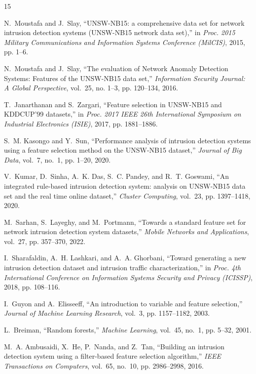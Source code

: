 \documentclass[conference]{IEEEtran}
\begin{document}
\begin{thebibliography}{15}

N.~Moustafa and J.~Slay, ``{UNSW-NB15}: a comprehensive data set for network intrusion detection systems ({UNSW-NB15} network data set),'' in \emph{Proc. 2015 Military Communications and Information Systems Conference (MilCIS)}, 2015, pp. 1--6.

N.~Moustafa and J.~Slay, ``The evaluation of Network Anomaly Detection Systems: Features of the {UNSW-NB15} data set,'' \emph{Information Security Journal: A Global Perspective}, vol.~25, no. 1--3, pp. 120--134, 2016.

T.~Janarthanan and S.~Zargari, ``Feature selection in {UNSW-NB15} and {KDDCUP'99} datasets,'' in \emph{Proc. 2017 IEEE 26th International Symposium on Industrial Electronics (ISIE)}, 2017, pp. 1881--1886.

S.~M. Kasongo and Y.~Sun, ``Performance analysis of intrusion detection systems using a feature selection method on the {UNSW-NB15} dataset,'' \emph{Journal of Big Data}, vol.~7, no.~1, pp. 1--20, 2020.

V.~Kumar, D.~Sinha, A.~K. Das, S.~C. Pandey, and R.~T. Goswami, ``An integrated rule-based intrusion detection system: analysis on {UNSW-NB15} data set and the real time online dataset,'' \emph{Cluster Computing}, vol.~23, pp. 1397--1418, 2020.

M.~Sarhan, S.~Layeghy, and M.~Portmann, ``Towards a standard feature set for network intrusion detection system datasets,'' \emph{Mobile Networks and Applications}, vol.~27, pp. 357--370, 2022.

I.~Sharafaldin, A.~H. Lashkari, and A.~A. Ghorbani, ``Toward generating a new intrusion detection dataset and intrusion traffic characterization,'' in \emph{Proc. 4th International Conference on Information Systems Security and Privacy (ICISSP)}, 2018, pp. 108--116.

I.~Guyon and A.~Elisseeff, ``An introduction to variable and feature selection,'' \emph{Journal of Machine Learning Research}, vol.~3, pp. 1157--1182, 2003.

L.~Breiman, ``Random forests,'' \emph{Machine Learning}, vol.~45, no.~1, pp. 5--32, 2001.

M.~A. Ambusaidi, X.~He, P.~Nanda, and Z.~Tan, ``Building an intrusion detection system using a filter-based feature selection algorithm,'' \emph{IEEE Transactions on Computers}, vol.~65, no.~10, pp. 2986--2998, 2016.


\end{thebibliography}
\end{document}
